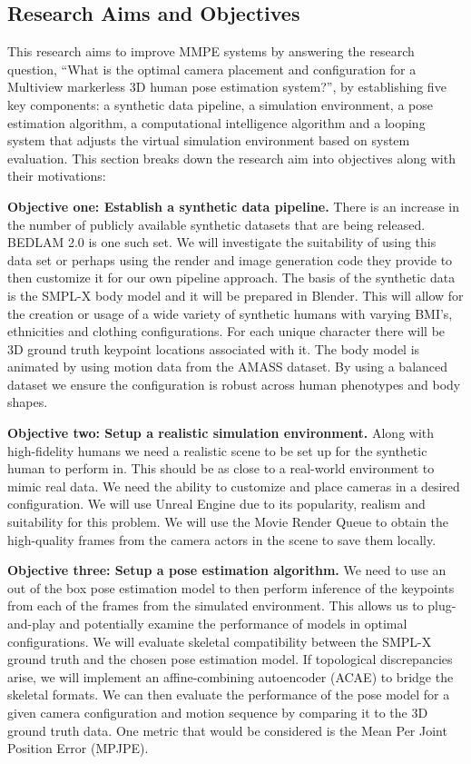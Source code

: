 \subsection{Research Aims and Objectives}
\label{sec:researchaimsandobjectives}

This research aims to improve MMPE systems by answering the research question, ``What is the optimal camera placement and configuration for a Multiview markerless 3D human pose estimation system?'', by establishing five key components: a synthetic data pipeline, a simulation environment, a pose estimation algorithm, a computational intelligence algorithm and a looping system that adjusts the virtual simulation environment based on system evaluation.
This section breaks down the research aim into objectives along with their motivations:

\textbf{Objective one: Establish a synthetic data pipeline.} There is an increase in the number of publicly available synthetic datasets that are being released. BEDLAM 2.0 is one such set. We will investigate the suitability of using this data set or perhaps using the render and image generation code they provide to then customize it for our own pipeline approach. The basis of the synthetic data is the SMPL-X body model and it will be prepared in Blender. This will allow for the creation or usage of a wide variety of synthetic humans with varying BMI’s, ethnicities and clothing configurations. For each unique character there will be 3D ground truth keypoint locations associated with it. The body model is animated by using motion data from the AMASS dataset. By using a balanced dataset we ensure the configuration is robust across human phenotypes and body shapes. 

\textbf{Objective two: Setup a realistic simulation environment.} Along with high-fidelity humans we need a realistic scene to be set up for the synthetic human to perform in. This should be as close to a real-world environment to mimic real data. We need the ability to customize and place cameras in a desired configuration. We will use Unreal Engine due to its popularity, realism and suitability for this problem. We will use the Movie Render Queue to obtain the high-quality frames from the camera actors in the scene to save them locally.

\textbf{Objective three: Setup a pose estimation algorithm.} We need to use an out of the box pose estimation model to then perform inference of the keypoints from each of the frames from the simulated environment. This allows us to plug-and-play and potentially examine the performance of models in optimal configurations. We will evaluate skeletal compatibility between the SMPL-X ground truth and the chosen pose estimation model. If topological discrepancies arise, we will implement an affine-combining autoencoder (ACAE) to bridge the skeletal formats. We can then evaluate the performance of the pose model for a given camera configuration and motion sequence by comparing it to the 3D ground truth data. One metric that would be considered is the Mean Per Joint Position Error (MPJPE).

